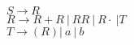 \begin{center}
    $ S \rightarrow R $ \\
    $ R \rightarrow R + R \ | \  R R \ | \ R \cdot \ | T $ \\
    $ T \rightarrow (R)  | \ a \ | \ b$ \\
\end{center}